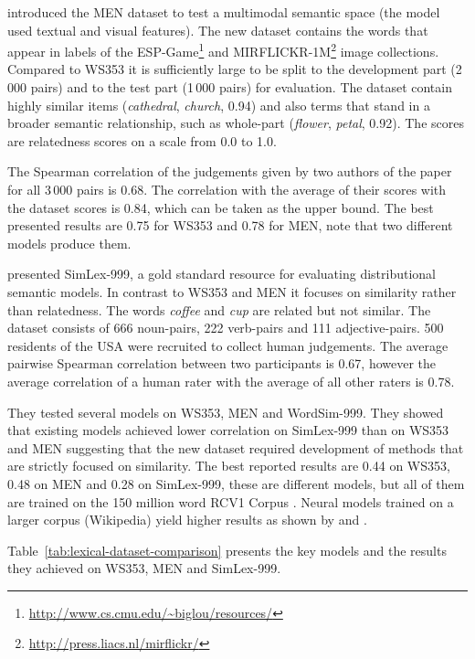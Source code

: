  introduced the MEN dataset to test a multimodal semantic space (the model used textual and visual features). The new dataset contains the words that appear in labels of the ESP-Game\footnote{\url{http://www.cs.cmu.edu/~biglou/resources/}} and MIRFLICKR-1M\footnote{\url{http://press.liacs.nl/mirflickr/}} image collections. Compared to WS353 it is sufficiently large to be split to the development part (2\,000 pairs) and to the test part (1\,000 pairs) for evaluation. The dataset contain highly similar items (\textit{cathedral}, \textit{church}, 0.94) and also terms that stand in a broader semantic relationship, such as whole-part (\textit{flower}, \textit{petal}, 0.92). The scores are relatedness scores on a scale from 0.0 to 1.0.

The Spearman correlation of the judgements given by two authors of the paper for all 3\,000 pairs is 0.68. The correlation with the average of their scores with the dataset scores is 0.84, which can be taken as the upper bound. The best presented results are 0.75 for WS353 and 0.78 for MEN, note that two different models produce them.

 presented SimLex-999, a gold standard resource for evaluating distributional semantic models. In contrast to WS353 and MEN it focuses on similarity rather than relatedness. The words \textit{coffee} and \textit{cup} are related but not similar. The dataset consists of 666 noun-pairs, 222 verb-pairs and 111 adjective-pairs. 500 residents of the USA were recruited to collect human judgements. The average pairwise Spearman correlation between two participants is 0.67, however the average correlation of a human rater with the average of all other raters is 0.78.

They tested several models on WS353, MEN and WordSim-999. They showed that existing models achieved lower correlation on SimLex-999 than on WS353 and MEN suggesting that the new dataset required development of methods that are strictly focused on similarity. The best reported results are 0.44 on WS353, 0.48 on MEN and 0.28 on SimLex-999, these are different models, but all of them are trained on the 150 million word RCV1 Corpus \cite{lewis2004rcv1}. Neural models trained on a larger corpus (Wikipedia) yield higher results as shown by  and .

Table~\ref{tab:lexical-dataset-comparison} presents the key models and the results they achieved on WS353, MEN and SimLex-999.

